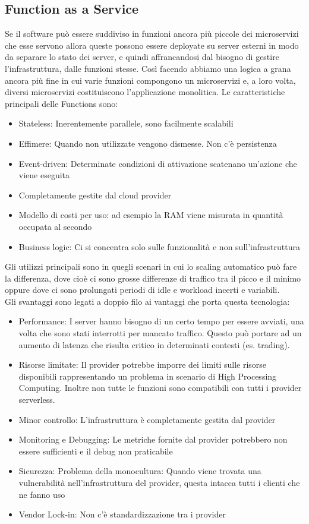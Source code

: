 \documentclass{article}
\begin{document}
		\subsection{Function as a Service}
		Se il software può essere suddiviso in funzioni ancora più piccole dei microservizi che esse servono allora queste possono essere deployate su server esterni in modo da separare lo stato dei server, e quindi affrancandosi dal bisogno di gestire l'infrastruttura, dalle funzioni stesse. Così facendo abbiamo una logica a grana ancora più fine in cui varie funzioni compongono un microservizi e, a loro volta, diversi microservizi costituiscono l'applicazione monolitica.
		Le caratteristiche principali delle Functions sono:
		\begin{itemize}
		\item Stateless: Inerentemente parallele, sono facilmente scalabili
		\item Effimere: Quando non utilizzate vengono dismesse. Non c'è persistenza
		\item Event-driven: Determinate condizioni di attivazione scatenano un'azione che viene eseguita
		\item Completamente gestite dal cloud provider
		\item Modello di costi per uso: ad esempio la RAM viene misurata in quantità occupata al secondo
		\item Business logic: Ci si concentra solo sulle funzionalità e non sull'infrastruttura
		\end{itemize}
		Gli utilizzi principali sono in quegli scenari in cui lo scaling automatico può fare la differenza, dove cioè ci sono grosse differenze di traffico tra il picco e il minimo oppure dove ci sono prolungati periodi di idle e workload incerti e variabili.
		\\ Gli svantaggi sono legati a doppio filo ai vantaggi che porta questa tecnologia:
		\begin{itemize}
		\item Performance: I server hanno bisogno di un certo tempo per essere avviati, una volta che sono stati interrotti per mancato traffico. Questo può portare ad un aumento di latenza che risulta critico in determinati contesti (es. trading).
		\item Risorse limitate: Il provider potrebbe imporre dei limiti sulle risorse disponibili rappresentando un problema in scenario di High Processing Computing. Inoltre non tutte le funzioni sono compatibili con tutti i provider serverless.
		\item Minor controllo: L'infrastruttura è completamente gestita dal provider
		\item Monitoring e Debugging: Le metriche fornite dal provider potrebbero non essere sufficienti e il debug non praticabile
		\item Sicurezza: Problema della monocultura: Quando viene trovata una vulnerabilità nell'infrastruttura del provider, questa intacca tutti i clienti che ne fanno uso
		\item Vendor Lock-in: Non c'è standardizzazione tra i provider
		\end{itemize}
		
\end{document}
